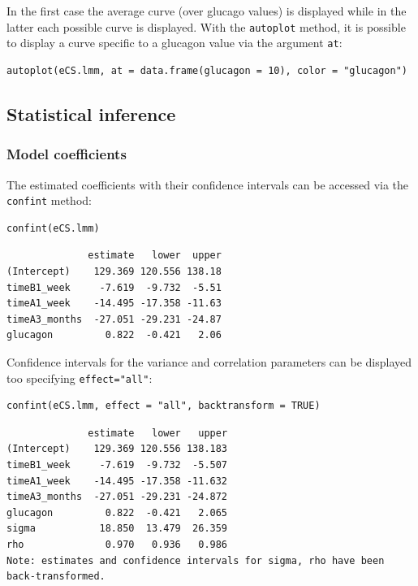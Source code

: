 \documentclass[12pt]{article}
\begin{document}
In the first case the average curve (over glucago values) is displayed
while in the latter each possible curve is displayed. With the
\texttt{autoplot} method, it is possible to display a curve specific to a
glucagon value via the argument \texttt{at}:
\lstset{language=r,label= ,caption= ,captionpos=b,numbers=none}
\begin{lstlisting}
autoplot(eCS.lmm, at = data.frame(glucagon = 10), color = "glucagon")
\end{lstlisting}

\subsection{Statistical inference}
\label{sec:org746fb80}

\subsubsection{Model coefficients}
\label{sec:org636a3fe}

The estimated coefficients with their confidence intervals can be accessed via the \texttt{confint} method:
\lstset{language=r,label= ,caption= ,captionpos=b,numbers=none}
\begin{lstlisting}
confint(eCS.lmm)
\end{lstlisting}

\begin{verbatim}
              estimate   lower  upper
(Intercept)    129.369 120.556 138.18
timeB1_week     -7.619  -9.732  -5.51
timeA1_week    -14.495 -17.358 -11.63
timeA3_months  -27.051 -29.231 -24.87
glucagon         0.822  -0.421   2.06
\end{verbatim}


\clearpage

Confidence intervals for the variance and correlation parameters can
be displayed too specifying \texttt{effect="all"}:
\lstset{language=r,label= ,caption= ,captionpos=b,numbers=none}
\begin{lstlisting}
confint(eCS.lmm, effect = "all", backtransform = TRUE)
\end{lstlisting}

\begin{verbatim}
              estimate   lower   upper
(Intercept)    129.369 120.556 138.183
timeB1_week     -7.619  -9.732  -5.507
timeA1_week    -14.495 -17.358 -11.632
timeA3_months  -27.051 -29.231 -24.872
glucagon         0.822  -0.421   2.065
sigma           18.850  13.479  26.359
rho              0.970   0.936   0.986
Note: estimates and confidence intervals for sigma, rho have been back-transformed.
\end{verbatim}
\end{document}
